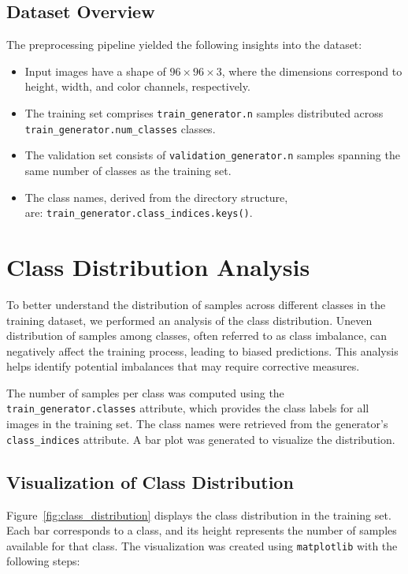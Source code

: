 \documentclass{article}
\begin{document}
\subsection{Dataset Overview}

The preprocessing pipeline yielded the following insights into the dataset:
\begin{itemize}
    \item Input images have a shape of \(96 \times 96 \times 3\), where the dimensions correspond to height, width, and color channels, respectively.
    \item The training set comprises \texttt{train\_generator.n} samples distributed across \texttt{train\_generator.num\_classes} classes.
    \item The validation set consists of \texttt{validation\_generator.n} samples spanning the same number of classes as the training set.
    \item The class names, derived from the directory structure, \\ are: \texttt{train\_generator.class\_indices.keys()}.
\end{itemize}

\section{Class Distribution Analysis}

To better understand the distribution of samples across different classes in the training dataset, we performed an analysis of the class distribution. Uneven distribution of samples among classes, often referred to as class imbalance, can negatively affect the training process, leading to biased predictions. This analysis helps identify potential imbalances that may require corrective measures.

The number of samples per class was computed using the \texttt{train\_generator.classes} attribute, which provides the class labels for all images in the training set. The class names were retrieved from the generator's \texttt{class\_indices} attribute. A bar plot was generated to visualize the distribution.

\subsection{Visualization of Class Distribution}

Figure~\ref{fig:class_distribution} displays the class distribution in the training set. Each bar corresponds to a class, and its height represents the number of samples available for that class. The visualization was created using \texttt{matplotlib} with the following steps:
\end{document}
